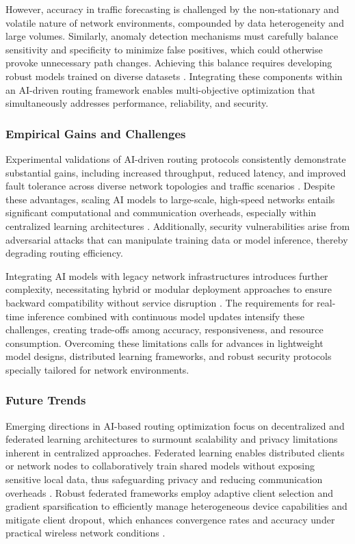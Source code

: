 \documentclass[sigconf]{acmart}
\begin{document}
However, accuracy in traffic forecasting is challenged by the non-stationary and volatile nature of network environments, compounded by data heterogeneity and large volumes. Similarly, anomaly detection mechanisms must carefully balance sensitivity and specificity to minimize false positives, which could otherwise provoke unnecessary path changes. Achieving this balance requires developing robust models trained on diverse datasets \cite{ref50}. Integrating these components within an AI-driven routing framework enables multi-objective optimization that simultaneously addresses performance, reliability, and security.

\subsubsection{Empirical Gains and Challenges}

Experimental validations of AI-driven routing protocols consistently demonstrate substantial gains, including increased throughput, reduced latency, and improved fault tolerance across diverse network topologies and traffic scenarios \cite{ref4}. Despite these advantages, scaling AI models to large-scale, high-speed networks entails significant computational and communication overheads, especially within centralized learning architectures \cite{ref53}. Additionally, security vulnerabilities arise from adversarial attacks that can manipulate training data or model inference, thereby degrading routing efficiency.

Integrating AI models with legacy network infrastructures introduces further complexity, necessitating hybrid or modular deployment approaches to ensure backward compatibility without service disruption \cite{ref48}. The requirements for real-time inference combined with continuous model updates intensify these challenges, creating trade-offs among accuracy, responsiveness, and resource consumption. Overcoming these limitations calls for advances in lightweight model designs, distributed learning frameworks, and robust security protocols specially tailored for network environments.

\subsubsection{Future Trends}

Emerging directions in AI-based routing optimization focus on decentralized and federated learning architectures to surmount scalability and privacy limitations inherent in centralized approaches. Federated learning enables distributed clients or network nodes to collaboratively train shared models without exposing sensitive local data, thus safeguarding privacy and reducing communication overheads \cite{ref53}. Robust federated frameworks employ adaptive client selection and gradient sparsification to efficiently manage heterogeneous device capabilities and mitigate client dropout, which enhances convergence rates and accuracy under practical wireless network conditions \cite{ref49}.
\end{document}
